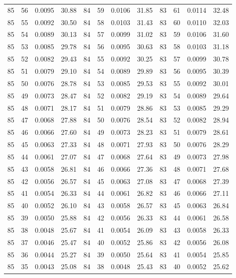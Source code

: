 \begin{tabular}{llll|llll|llll}
85 & 56 & 0.0095 & 30.88 & 84 & 59 & 0.0106 & 31.85 & 83 & 61 & 0.0114 & 32.48\\
85 & 55 & 0.0092 & 30.50 & 84 & 58 & 0.0103 & 31.43 & 83 & 60 & 0.0110 & 32.03\\
85 & 54 & 0.0089 & 30.13 & 84 & 57 & 0.0099 & 31.02 & 83 & 59 & 0.0106 & 31.60\\
85 & 53 & 0.0085 & 29.78 & 84 & 56 & 0.0095 & 30.63 & 83 & 58 & 0.0103 & 31.18\\
85 & 52 & 0.0082 & 29.43 & 84 & 55 & 0.0092 & 30.25 & 83 & 57 & 0.0099 & 30.78\\
85 & 51 & 0.0079 & 29.10 & 84 & 54 & 0.0089 & 29.89 & 83 & 56 & 0.0095 & 30.39\\
85 & 50 & 0.0076 & 28.78 & 84 & 53 & 0.0085 & 29.53 & 83 & 55 & 0.0092 & 30.01\\
85 & 49 & 0.0073 & 28.47 & 84 & 52 & 0.0082 & 29.19 & 83 & 54 & 0.0089 & 29.64\\
85 & 48 & 0.0071 & 28.17 & 84 & 51 & 0.0079 & 28.86 & 83 & 53 & 0.0085 & 29.29\\
85 & 47 & 0.0068 & 27.88 & 84 & 50 & 0.0076 & 28.54 & 83 & 52 & 0.0082 & 28.94\\
85 & 46 & 0.0066 & 27.60 & 84 & 49 & 0.0073 & 28.23 & 83 & 51 & 0.0079 & 28.61\\
85 & 45 & 0.0063 & 27.33 & 84 & 48 & 0.0071 & 27.93 & 83 & 50 & 0.0076 & 28.29\\
85 & 44 & 0.0061 & 27.07 & 84 & 47 & 0.0068 & 27.64 & 83 & 49 & 0.0073 & 27.98\\
85 & 43 & 0.0058 & 26.81 & 84 & 46 & 0.0066 & 27.36 & 83 & 48 & 0.0071 & 27.68\\
85 & 42 & 0.0056 & 26.57 & 84 & 45 & 0.0063 & 27.08 & 83 & 47 & 0.0068 & 27.39\\
85 & 41 & 0.0054 & 26.33 & 84 & 44 & 0.0061 & 26.82 & 83 & 46 & 0.0066 & 27.11\\
85 & 40 & 0.0052 & 26.10 & 84 & 43 & 0.0058 & 26.57 & 83 & 45 & 0.0063 & 26.84\\
85 & 39 & 0.0050 & 25.88 & 84 & 42 & 0.0056 & 26.33 & 83 & 44 & 0.0061 & 26.58\\
85 & 38 & 0.0048 & 25.67 & 84 & 41 & 0.0054 & 26.09 & 83 & 43 & 0.0058 & 26.33\\
85 & 37 & 0.0046 & 25.47 & 84 & 40 & 0.0052 & 25.86 & 83 & 42 & 0.0056 & 26.08\\
85 & 36 & 0.0044 & 25.27 & 84 & 39 & 0.0050 & 25.64 & 83 & 41 & 0.0054 & 25.85\\
85 & 35 & 0.0043 & 25.08 & 84 & 38 & 0.0048 & 25.43 & 83 & 40 & 0.0052 & 25.62\\

\end{tabular}
